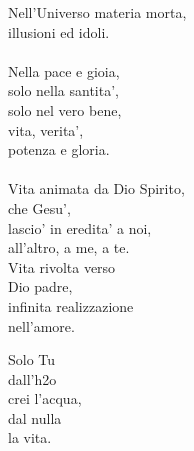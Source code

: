 \begin{haiku}
Nell'Universo materia morta,\\
illusioni ed idoli.\\
\leavevmode\\
Nella pace e gioia,\\
solo nella santita',\\
solo nel vero bene,\\
vita, verita',\\
potenza e gloria.\\
\leavevmode\\
Vita animata da Dio Spirito,\\
che Gesu',\\
lascio' in eredita' a noi,\\
all'altro, a me, a te.\\
Vita rivolta verso\\
Dio padre,\\
infinita realizzazione\\
nell'amore.\\
\end{haiku}


\begin{haiku}
Solo Tu\\
dall'h2o\\
crei l'acqua,\\
dal nulla\\
la vita.\\
\end{haiku}

